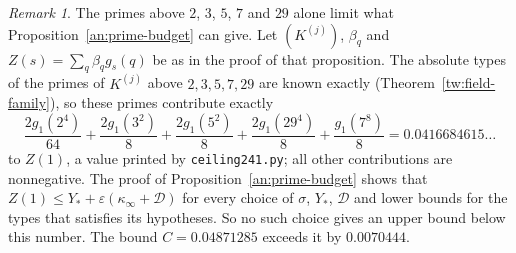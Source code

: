 \documentclass[11pt]{amsart}
\numberwithin{equation}{section}
\theoremstyle{definition}
\theoremstyle{remark}
\newtheorem{remark}[equation]{Remark}
\newcommand{\ceiling}{0.04871285}
\begin{document}
\begin{remark}\label{an:limit}
The primes above $2$, $3$, $5$, $7$ and $29$ alone limit what
Proposition~\ref{an:prime-budget} can give. Let $(K^{(j)})$, $\beta_q$ and
$Z(s)=\sum_q\beta_qg_s(q)$ be as in the proof of that proposition. The
absolute types of the primes of $K^{(j)}$ above $2,3,5,7,29$ are known exactly
(Theorem~\ref{tw:field-family}), so these primes contribute exactly
\[
 \frac{2g_1(2^4)}{64}+\frac{2g_1(3^2)}8+\frac{2g_1(5^2)}8
 +\frac{2g_1(29^4)}8+\frac{g_1(7^8)}8=0.0416684615\ldots
\]
to $Z(1)$, a value printed by \texttt{ceiling241.py}; all other
contributions are nonnegative. The proof of
Proposition~\ref{an:prime-budget} shows that
$Z(1)\le Y_*+\varepsilon(\kappa_\infty+\mathcal D)$ for every choice of
$\sigma$, $Y_*$, $\mathcal D$ and lower bounds for the types that satisfies
its hypotheses. So no such choice gives an upper bound below this number.
The bound $C=\ceiling$ exceeds it by $0.0070444$.
\end{remark}
\end{document}
